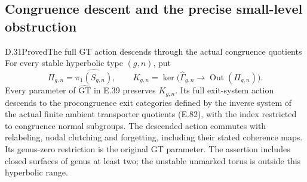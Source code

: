 \subsection{Congruence descent and the precise small-level obstruction}

\begin{result}{D.31}{Proved}{The full GT action descends through the actual congruence quotients}
For every stable hyperbolic type $(g,n)$, put
\[
 \Pi_{g,n}=\widehat{\pi_1(S_{g,n})},\qquad
 K_{g,n}=\ker\bigl(\widehat\Gamma_{g,n}
                 \longrightarrow\operatorname{Out}(\Pi_{g,n})\bigr).
                                                               \tag{D.40}
\]
Every parameter of $\widehat{\mathrm{GT}}$ in E.39 preserves
$K_{g,n}$.  Its full exit-system action descends to the
procongruence exit categories defined by the inverse system
of the actual finite ambient transporter quotients (E.82),
with the index restricted to congruence normal subgroups.
The descended action commutes with relabeling, nodal clutching
and forgetting, including their stated coherence maps.  Its
genus-zero restriction is the original GT parameter.
The assertion includes closed surfaces of genus at least two;
the unstable unmarked torus is outside this hyperbolic range.
\end{result}
